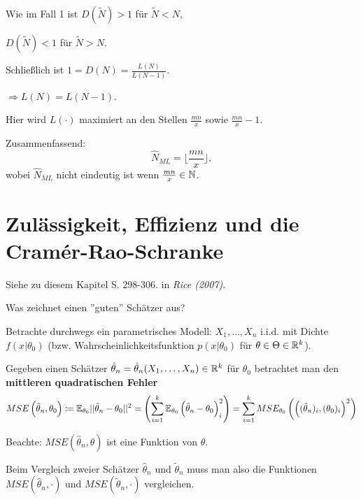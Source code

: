 \documentclass{tstextbook}
\begin{document}
\begin{example}
\begin{itemize}
		Wie im Fall 1 ist $ D(\tilde{N}) > 1 $ für $ \tilde{N} < N $, 
		
		$ D(\tilde{N}) < 1 $ für $ \tilde{N} > N $.
		
		Schließlich ist $ 1 = D(N) = \frac{L(N)}{L(N-1)} $.
		
		$ \Rightarrow L(N) = L(N-1) $. 
		
		Hier wird $ L(\cdot) $ maximiert an den Stellen $ \frac{mn}{x} $ sowie $ \frac{mn}{x} -1 $. 
	\end{itemize}

	Zusammenfassend: 
	\[
	\hat{N}_{ML} = \lfloor\frac{mn}{x}\rfloor,
	\]
	wobei $ \hat{N}_{ML} $ nicht eindeutig ist wenn $ \frac{mn}{x} \in \mathbb N $.
\end{example}

\section{Zulässigkeit, Effizienz und die Cramér-Rao-Schranke}

\begin{book}
	Siehe zu diesem Kapitel S. 298-306. in	\textit{Rice (2007)}.
\end{book}

Was zeichnet einen ''guten'' Schätzer aus?

Betrachte durchwegs ein parametrisches Modell:
$ X_1,\ldots,X_n $ i.i.d. mit Dichte $ f(x | \theta_0)$ (bzw. Wahrscheinlichkeitsfunktion $ p(x | \theta_0)$ für $\theta \in \Theta \in \mathbb R^k $).

Gegeben einen Schätzer $ \hat{\theta}_n = \hat{\theta}_n(X_1, \ldots, X_n) \in \mathbb R^k $ für $ \theta_0 $ betrachtet man den \textbf{mittleren quadratischen Fehler}  
	\[
	MSE\left(\hat{\theta}_n,\theta_0\right) \coloneqq \mathbb E_{\theta_0} ||\hat{\theta}_n-\theta_0||^2=\left(\sum_{i=1}^{k} \mathbb E_{\theta_0} \left(\hat{\theta}_n -\theta_{0}\right)_i ^2\right) = \sum_{i=1}^{k} MSE_{\theta_0}\left(\left((\hat{\theta}_n)_i , (\theta_{0})_i \right)^2\right)
	\]

\begin{remark}
	Beachte: $MSE(\hat{\theta}_n, \theta)$ ist eine Funktion von $\theta$.
	
\end{remark}

Beim Vergleich zweier Schätzer $\hat{\theta}_n$ und $\tilde{\theta}_n$ muss man also die Funktionen $MSE(\hat{\theta}_n, \cdot) $ und $ MSE(\tilde{\theta}_n, \cdot)$ vergleichen. 
\end{document}
